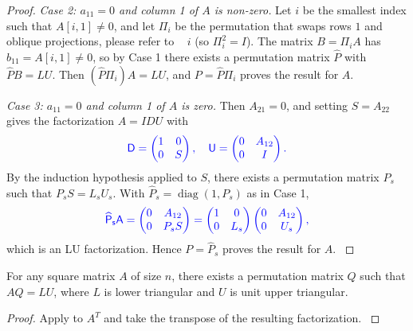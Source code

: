 \documentclass[10pt,twoside]{siamart1116}
\numberwithin{theorem}{section}
\providecommand{\DIFadd}[1]{{\protect\color{blue} \sf #1}} %
\providecommand{\DIFdel}[1]{{\protect\color{red} \scriptsize #1}} %
\providecommand{\DIFaddbegin}{} %
\providecommand{\DIFaddend}{} %
\providecommand{\DIFdelbegin}{} %
\providecommand{\DIFdelend}{} %
\begin{document}
\begin{proof}
  \DIFadd{\emph{Case 2: $a_{11} = 0$ and column 1 of $A$ is non-zero.} Let $i$ be the smallest index such that $A[i,1] \neq 0$, and let $\Pi_i$ be the permutation that swaps rows $1$ }\DIFaddend and \DIFdelbegin \DIFdel{oblique projections, please refer to ~\cite{Ouellette_1981,Zhang_2006,Householder_2013}}\DIFdelend \DIFaddbegin \DIFadd{$i$ (so $\Pi_i^2 = I$). The matrix $B = \Pi_i A$ has $b_{11} = A[i,1] \neq 0$, so by Case 1 there exists a permutation matrix $\widehat{P}$ with $\widehat{P} B = LU$. Then $(\widehat{P} \Pi_i) A = LU$, and $P = \widehat{P} \Pi_i$ proves the result for $A$}\DIFaddend .

  \DIFaddbegin \DIFadd{\emph{Case 3: $a_{11} = 0$ and column 1 of $A$ is zero.} Then $A_{21} = 0$, and setting $S = A_{22}$ gives the factorization $A = IDU$ with
  }\[
    \DIFadd{D =
    \begin{pmatrix}
      1 & 0 \\
      0 & S
    \end{pmatrix}, \quad
    U =
    \begin{pmatrix}
      0 & A_{12} \\
      0 & I
    \end{pmatrix}.
  }\]
  \DIFadd{By the induction hypothesis applied to $S$, there exists a permutation matrix $P_s$ such that $P_s S = L_s U_s$. With $\widehat{P}_s = \operatorname{diag}(1, P_s)$ as in Case 1,
  }\[
    \DIFadd{\widehat{P}_s A
    =
    \begin{pmatrix}
      0 & A_{12}  \\
      0 & P_s S
    \end{pmatrix}
    =
    \begin{pmatrix}
      1 & 0   \\
      0 & L_s
    \end{pmatrix}
    \begin{pmatrix}
      0 & A_{12} \\
      0 & U_s
    \end{pmatrix},
  }\]
  \DIFadd{which is an LU factorization. Hence $P = \widehat{P}_s$ proves the result for $A$.
}\end{proof}

\begin{corollary}\label{cor:col_permutation}
  \DIFadd{For any square matrix $A$ of size $n$, there exists a permutation matrix $Q$ such that $AQ = LU$, where $L$ is lower triangular and $U$ is unit upper triangular.
}\end{corollary}

\begin{proof}
  \DIFadd{Apply } \DIFadd{to $A^T$ and take the transpose of the resulting factorization.
}\end{proof}
\end{document}
